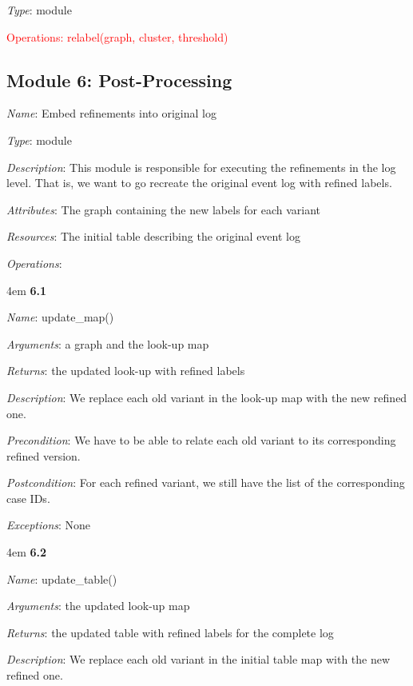 \documentclass[notitlepage]{article}
\begin{document}
\begin{flushleft}
\textit{Type}: module

\textcolor{red}{Operations: relabel(graph, cluster, threshold)}



\subsection{Module 6: Post-Processing}
\textit{Name}: Embed refinements into original log 

\textit{Type}: module

\textit{Description}: This module is responsible for executing the refinements in the log level. That is, we want to go recreate the original event log with refined labels.

\textit{Attributes}: The graph containing the new labels for each variant

\textit{Resources}: The initial table describing the original event log

\textit{Operations}: 
\medskip

\par
\begingroup
\leftskip4em
\textbf{6.1} 

\textit{Name}: update\_map()

\textit{Arguments}: a graph and the look-up map

\textit{Returns}: the updated look-up with refined labels

\textit{Description}: We replace each old variant in the look-up map with the new refined one.

\textit{Precondition}: We have to be able to relate each old variant to its corresponding refined version.

\textit{Postcondition}: For each refined variant, we still have the list of the corresponding case IDs.

\textit{Exceptions}: None
\par
\endgroup


\medskip

\par
\begingroup
\leftskip4em
\textbf{6.2} 

\textit{Name}: update\_table()

\textit{Arguments}: the updated look-up map

\textit{Returns}: the updated table with refined labels for the complete log

\textit{Description}: We replace each old variant in the initial table map with the new refined one.


\end{flushleft}
\end{document}
